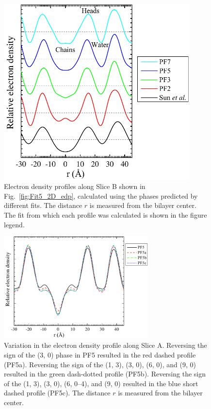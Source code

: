 \begin{figure}[htbp]
  \centering
  \includegraphics[width=0.9\textwidth]{figures/ripple/LAXS/minor_diff_models}
  \caption{Electron density profiles along Slice B shown in Fig.~\ref{fig:Fit5_2D_edp}, 
  calculated using the phases
  predicted by different fits. The distance $r$ is measured from the bilayer 
  center. The fit from which each profile was calculated
  is shown in the figure legend.}
  \label{fig:minor_diff_models}
\end{figure}




\begin{figure}[htbp]
  \centering
  \includegraphics[width=0.7\textwidth]{figures/ripple/LAXS/major_phase_variation}
  \caption{Variation in the electron density profile along Slice A. 
  Reversing the sign of the (3, 0) phase in PF5 
  resulted in the red dashed profile (PF5a). Reversing the sign of the 
  (1, 3), (3, 0), (6, 0), and (9, 0) resulted in the green dash-dotted profile
  (PF5b). Reversing the sign of the (1, 3), (3, 0), (6, 0--4), and (9, 0)
  resulted in the blue short dashed profile (PF5c). 
  The distance $r$ is measured from the bilayer center.}
  \label{fig:major_phase_variation}
\end{figure}

